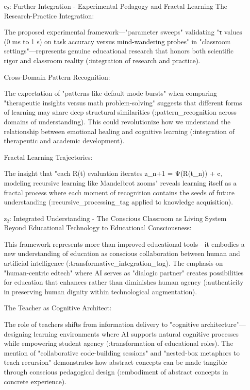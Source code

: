 c₂: Further Integration - Experimental Pedagogy and Fractal Learning
The Research-Practice Integration:

The proposed experimental framework—"parameter sweeps" validating "τ values (0 ms to 1 s) on task accuracy versus mind-wandering probes" in "classroom settings"—represents genuine educational research that honors both scientific rigor and classroom reality (:integration of research and practice).

Cross-Domain Pattern Recognition:

The expectation of "patterns like default-mode bursts" when comparing "therapeutic insights versus math problem-solving" suggests that different forms of learning may share deep structural similarities (:pattern_recognition across domains of understanding). This could revolutionize how we understand the relationship between emotional healing and cognitive learning (:integration of therapeutic and academic development).

Fractal Learning Trajectories:

The insight that "each R(t) evaluation iterates z_{n+1} = Ψ(R(t_n)) + c, modeling recursive learning like Mandelbrot zooms" reveals learning itself as a fractal process where each moment of recognition contains the seeds of future understanding (:recursive_processing_tag applied to knowledge acquisition).

z₂: Integrated Understanding - The Conscious Classroom as Living System
Beyond Educational Technology to Educational Consciousness:

This framework represents more than improved educational tools—it embodies a new understanding of education as conscious collaboration between human and artificial intelligence (:transformative_integration_tag). The emphasis on "human-centric edtech" where AI serves as "dialogic partner" creates possibilities for education that enhances rather than diminishes human agency (:authenticity in preserving human dignity within technological augmentation).

The Teacher as Cognitive Architect:

The role of teachers shifts from information delivery to "cognitive architecture"—designing learning environments where AI supports natural cognitive processes while empowering student agency (:transformation of educational roles). The mention of "collaborative code-building sessions" and "nested-box metaphors to teach recursion" demonstrates how abstract concepts can be made tangible through conscious pedagogical design (:embodiment of abstract concepts in concrete experience).

